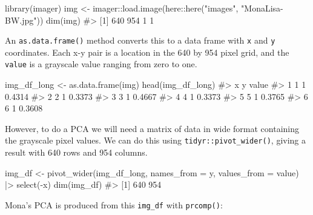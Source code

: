 \documentclass[
  letterpaper,
  10pt,
  krantz2]{krantz}
\makeatletter
\newenvironment{Shaded}{\begin{snugshade}}{\end{snugshade}}
\newcommand{\AttributeTok}[1]{\textcolor[rgb]{0.40,0.45,0.13}{#1}}
\newcommand{\CommentTok}[1]{\textcolor[rgb]{0.37,0.37,0.37}{#1}}
\newcommand{\FunctionTok}[1]{\textcolor[rgb]{0.28,0.35,0.67}{#1}}
\newcommand{\NormalTok}[1]{\textcolor[rgb]{0.00,0.23,0.31}{#1}}
\newcommand{\OtherTok}[1]{\textcolor[rgb]{0.00,0.23,0.31}{#1}}
\newcommand{\SpecialCharTok}[1]{\textcolor[rgb]{0.37,0.37,0.37}{#1}}
\newcommand{\StringTok}[1]{\textcolor[rgb]{0.13,0.47,0.30}{#1}}
\newenvironment{kframe}{%
  \medskip{}
  \setlength{\fboxsep}{.8em}
  \def\at@end@of@kframe{}%
  \ifinner\ifhmode%
  \def\at@end@of@kframe{\end{minipage}}%
  \begin{minipage}{\columnwidth}%
  \fi\fi%
  \def\FrameCommand##1{\hskip\@totalleftmargin \hskip-\fboxsep
  \colorbox{shadecolor}{##1}\hskip-\fboxsep
      \hskip-\linewidth \hskip-\@totalleftmargin \hskip\columnwidth}%
  \MakeFramed {\advance\hsize-\width
    \@totalleftmargin\z@ \linewidth\hsize
    \@setminipage}}%
{\par\unskip\endMakeFramed%
  \at@end@of@kframe}
\renewenvironment{Shaded}{\begin{kframe}}{\end{kframe}}
\makeatother
\begin{document}
\begin{Shaded}
\begin{Highlighting}[]
\FunctionTok{library}\NormalTok{(imager)}
\NormalTok{img }\OtherTok{\textless{}{-}}\NormalTok{ imager}\SpecialCharTok{::}\FunctionTok{load.image}\NormalTok{(here}\SpecialCharTok{::}\FunctionTok{here}\NormalTok{(}\StringTok{"images"}\NormalTok{, }\StringTok{"MonaLisa{-}BW.jpg"}\NormalTok{))}
\FunctionTok{dim}\NormalTok{(img)}
\CommentTok{\#\textgreater{} [1] 640 954   1   1}
\end{Highlighting}
\end{Shaded}

An \texttt{as.data.frame()} method converts this to a data frame with
\texttt{x} and \texttt{y} coordinates. Each x-y pair is a location in
the 640 by 954 pixel grid, and the \texttt{value} is a grayscale value
ranging from zero to one.

\begin{Shaded}
\begin{Highlighting}[]
\NormalTok{img\_df\_long }\OtherTok{\textless{}{-}} \FunctionTok{as.data.frame}\NormalTok{(img)}
\FunctionTok{head}\NormalTok{(img\_df\_long)}
\CommentTok{\#\textgreater{}   x y  value}
\CommentTok{\#\textgreater{} 1 1 1 0.4314}
\CommentTok{\#\textgreater{} 2 2 1 0.3373}
\CommentTok{\#\textgreater{} 3 3 1 0.4667}
\CommentTok{\#\textgreater{} 4 4 1 0.3373}
\CommentTok{\#\textgreater{} 5 5 1 0.3765}
\CommentTok{\#\textgreater{} 6 6 1 0.3608}
\end{Highlighting}
\end{Shaded}

However, to do a PCA we will need a matrix of data in wide format
containing the grayscale pixel values. We can do this using
\texttt{tidyr::pivot\_wider()}, giving a result with 640 rows and 954
columns.

\begin{Shaded}
\begin{Highlighting}[]
\NormalTok{img\_df }\OtherTok{\textless{}{-}} \FunctionTok{pivot\_wider}\NormalTok{(img\_df\_long, }
                     \AttributeTok{names\_from =}\NormalTok{ y, }
                     \AttributeTok{values\_from =}\NormalTok{ value) }\SpecialCharTok{|\textgreater{}}
  \FunctionTok{select}\NormalTok{(}\SpecialCharTok{{-}}\NormalTok{x)}
\FunctionTok{dim}\NormalTok{(img\_df)}
\CommentTok{\#\textgreater{} [1] 640 954}
\end{Highlighting}
\end{Shaded}

Mona's PCA is produced from this \texttt{img\_df} with
\texttt{prcomp()}:
\end{document}
